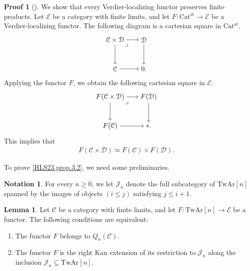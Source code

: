 \documentclass[a4paper,dvipdfmx,11pt,reqno]{amsart}
\newcommand{\C}{\mathcal{C}}
\newcommand{\D}{\mathcal{D}}
\newcommand{\E}{\mathcal{E}}
\newcommand{\J}{\mathcal{J}}
\newcommand{\Catst}{\mathrm{Cat^{st}}}
\newcommand{\TwAr}{\mathrm{TwAr}}
\theoremstyle{definition}
\newtheorem{lemma}[theorem]{Lemma}
\newtheorem{notation}[theorem]{Notation}
\newtheorem{newproof}[theorem]{Proof}
\begin{document}
\begin{newproof}[] \label{proof_of_HLS23.obs.2.2}
  We show that every Verdier-localizing functor preserves finite products.
  Let $\E$ be a category with finite limits, and let $F : \Catst \to \E$ be a Verdier-localizing functor.
  The following diagram is a cartesian square in $\Catst$.
  \[\begin{tikzpicture}[auto,->] 
    \node (tl) at (0,1.5) {$\C \times \D$}; 
    \node (tr) at (1.5,1.5) {$\D$};
    \node (bl) at (0,0) {$\C$}; 
    \node (br) at (1.5,0) {$0.$}; 
    \draw (tl) -- node {} (tr); 
    \draw (bl) -- node[swap] {} (br); 
    \draw (tl) -- node[swap] {} (bl);
    \draw (tr) -- node {} (br); 
    \node at (tl.south east) {$\lrcorner$};
  \end{tikzpicture}\]
  Applying the functor $F$, we obtain the following cartesian square in $\E$.
  \[\begin{tikzpicture}[auto,->] 
    \node (tl) at (0,1.5) {$F(\C \times \D)$}; 
    \node (tr) at (2,1.5) {$F(\D)$};
    \node (bl) at (0,0) {$F(\C)$}; 
    \node (br) at (2,0) {$\ast.$}; 
    \draw (tl) -- node {} (tr); 
    \draw (bl) -- node[swap] {} (br); 
    \draw (tl) -- node[swap] {} (bl);
    \draw (tr) -- node {} (br); 
    \node at (tl.south east) {$\lrcorner$};
  \end{tikzpicture}\]
  This implies that 
  \begin{align*}
    F(\C \times \D) \simeq F(\C) \times F(\D).
  \end{align*}
\end{newproof}



To prove \cref{HLS23.prop.3.2}, we need some preliminaries.

\begin{notation}
  For every $n \geq 0$, we let $\J_n$ denote the full subcategory of $\TwAr[n]$ spanned by the images of objects $(i \leq j)$ satisfying $j \leq i+1$.
\end{notation}

\begin{lemma} \label{Ber.lem.4.28}
  Let $\C$ be a category with finite limits, and let $F : \TwAr[n] \to \E$ be a functor.
  The following conditions are equivalent:
  \begin{enumerate}
    \item The functor $F$ belongs to $Q_n(\C)$.
    \item The functor $F$ is the right Kan extension of its restriction to $\J_n$ along the inclusion $\J_n \subseteq \TwAr[n]$.
  \end{enumerate}
\end{lemma}
\end{document}
